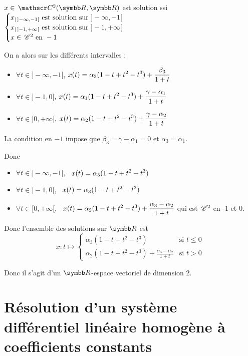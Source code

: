 \begin{exemple}
    $x \in \mc 2 (\R, \R)$ est solution ssi 
    $\begin{cases}
        x_{|\,]-\infty, -1[} \text{ est solution sur } ]-\infty, -1[ \\
        x_{|\,]-1, + \infty[} \text{ est solution sur } ]-1, +\infty[ \\
        x \in \,\mathscr C^{2} \text{ en } -1
    \end{cases}$

    On a alors sur les différents intervalles :
    \begin{itemize}
        \item $\forall t \in ]-\infty, -1[$, $\displaystyle x(t) = \alpha_3 (1 - t + t^2 - t^3) + \frac{\beta_3} {1 + t}$
        \item $\forall t \in ]-1, 0[$, $\displaystyle x(t) = \alpha_1 (1 - t + t^2 - t^3) + \frac{\gamma - \alpha_1} {1 + t}$
        \item $\forall t \in [0, + \infty[$, $\displaystyle x(t) = \alpha_2 (1 - t + t^2 - t^3) + \frac{\gamma - \alpha_2} {1 + t}$
    \end{itemize}
    
    La condition en $-1$ impose que $\beta_3 = \gamma - \alpha_1 = 0$ et 
    $\alpha_3 = \alpha_1$.

    Donc 
    \begin{itemize}
        \item $\forall t \in ] - \infty, -1[$, \, $\displaystyle x(t) = \alpha_3 ( 1 - t + t^2 - t^3)$
        \item $\forall t \in ]-1, 0[$, \, $\displaystyle x(t) = \alpha_3 (1 - t + t^2 - t^3)$
        \item $\forall t \in [0, +\infty[$, \, $\displaystyle x(t) = \alpha_2 (1 - t + t^2 - t^3) + \frac{\alpha_3 - \alpha_2} {1 + t}$
        qui est $\,\mathscr C^{2}$ en -1 et 0. 
    \end{itemize}

    Donc l'ensemble des solutions sur $\R$ est $$x : t \mapsto \begin{cases}
        \alpha_3 (1 - t + t^2 - t^3) & \text{si } t \leqslant 0 \\
        \alpha_2 (1 - t + t^2 - t^3) + \frac{\alpha_3 - \alpha_2} {1 + t} & \text{si } t > 0
    \end{cases}$$

    Donc il s'agit d'un $\R$-espace vectoriel de dimension 2. 
\end{exemple}

\section{Résolution d'un système différentiel linéaire homogène à coefficients constants}
